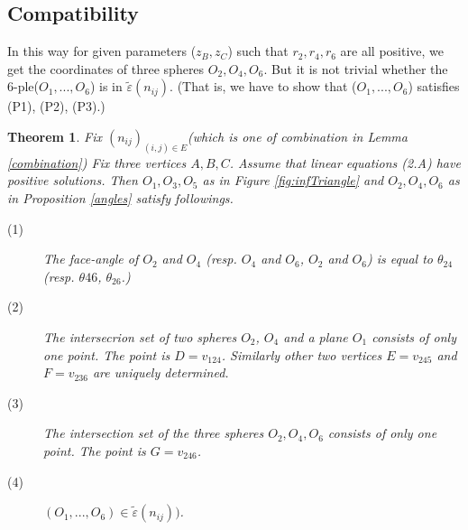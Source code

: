 \documentclass[dvipdfmx]{interact}
\theoremstyle{plain}%
\newtheorem{theorem}{Theorem}[section]
\theoremstyle{definition}
\theoremstyle{remark}
\theoremstyle{problemstyle}
\begin{document}
\subsection{Compatibility}
In this way for given parameters ($z_B, z_C$) such that $r_2, r_4, r_6$
are all positive, we get the coordinates of three spheres 
$O_2, O_4, O_6$. But it is not trivial whether the 6-ple($O_1, ..., O_6$) is
in $\tilde\varepsilon(n_{ij})$. (That is, we have to show that 
($O_1,..., O_6$) satisfies (P1), (P2), (P3).)

\begin{theorem}\label{compat}
 Fix $(n_{ij})_{(i, j)\in E}$(which is one of combination in Lemma
 \ref{combination})
 Fix three vertices $A,B,C$. Assume that linear equations (2.A) have
 positive solutions. Then $O_1, O_3, O_5$ as in Figure \ref{fig:infTriangle} and
 $O_2, O_4, O_6$ as in Proposition \ref{angles} satisfy followings.
 \begin{description}
  \item[(1)] The face-angle of $O_2$ and $O_4$ (resp. $O_4$ and $O_6$,
             $O_2$ and $O_6$) is equal to $\theta_{24}$
             (resp. $\theta{46}$, $\theta_{26}$.)
  \item[(2)] The intersecrion set of two spheres $O_2$, $O_4$ and a plane
             $O_1$ consists of only one point. The point is 
             $D = v_{124}$. Similarly other two vertices $E = v_{245}$
             and $F = v_{236}$ are uniquely determined.
  \item[(3)] The intersection set of the three spheres $O_2, O_4, O_6$
             consists of only one point. The point is $G = v_{246}$.
             
  \item[(4)] $(O_1, ..., O_6) \in \tilde\varepsilon(n_{ij}))$.
\end{description}
\end{theorem}
\end{document}
